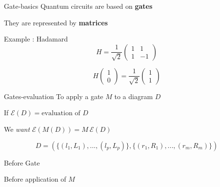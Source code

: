 \begin{frame}[noframenumbering]{Gate-basics}
  Quantum circuits are based on \textbf{gates}

  \vspace{1em}
  They are represented by \textbf{matrices}

  \pause

  \vspace{1em}
  Example : Hadamard
  $$H = \frac{1}{\sqrt{2}}\begin{pmatrix}
    1 & 1 \\
    1 & -1
  \end{pmatrix}$$

  $$H \begin{pmatrix}
    1 \\ 0
  \end{pmatrix} = \frac{1}{\sqrt{2}} \begin{pmatrix}
     1 \\ 1
  \end{pmatrix}$$
\end{frame}

\begin{frame}{Gates-evaluation}
  To apply a gate $M$ to a diagram $D$

  \pause

  \vspace{1em}
  If $\mathcal E(D) = \text{evaluation of } D$

  \vspace{1em}
  We \textit{want}
  $\mathcal E(M(D)) = M~\mathcal E(D)$

  \pause

  $$D = (\{(l_1, L_1), ..., (l_p, L_p)\}, \{(r_1,R_1), ..., (r_m, R_m)\})$$
\end{frame}

\begin{frame}{Before Gate}
  \begin{figure}[ht]
    \centering
  \end{figure}
  \begin{center}
    {Before application of $M$}
  \end{center}
\end{frame}

